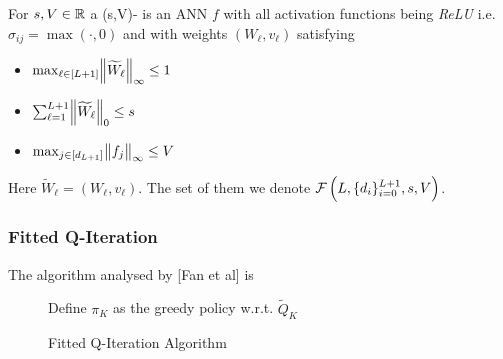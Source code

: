 \begin{defn}
  For $s,V \in \mathbb{R}$ a (s,V)- is an ANN $f$
  with all activation functions being \emph{ReLU}
  i.e. $\sigma_{ij} = \max(\cdot, 0)$
  and with weights $(W_\ell, v_\ell)$ satisfying
  \begin{multicols}{3}
    \begin{itemize}
      \item $\max_{\ell \in [L+1]} \norm{\widetilde{W}_\ell}_\infty \leq 1$
      \item $\sum_{\ell = 1}^{L+1} \norm{\widetilde{W}_\ell}_0 \leq s$
      \item $\max_{j \in [d_{L+1}]} \norm{f_j}_\infty \leq V$
    \end{itemize}
  \end{multicols}
  Here $\widetilde{W}_\ell = (W_\ell, v_\ell)$.
  The set of them we denote $\mathcal{F}\left(L, \{d_i\}_{i=0}^{L+1},s,V \right)$.
  \label{def:sparseReLU}
\end{defn}

\subsubsection{Fitted Q-Iteration}
The algorithm analysed by [Fan et al] is
\begin{figure}[H]
\begin{algorithm}[H] %
  \caption{Fitted Q-Iteration Algorithm}
  Define $\pi_K$ as the greedy policy w.r.t. $\widetilde{Q}_K$ \\
  \label{alg:fqi}
\end{algorithm}
\end{figure}


